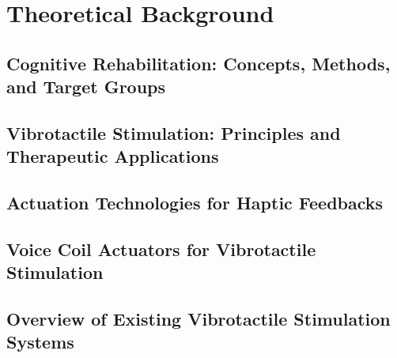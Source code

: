 \chapter[Theoretical Background]{Theoretical Background}

\section{Cognitive Rehabilitation: Concepts, Methods, and Target Groups}

\section{Vibrotactile Stimulation: Principles and Therapeutic Applications}

\section{Actuation Technologies for Haptic Feedbacks}

\section{Voice Coil Actuators for Vibrotactile Stimulation}

\section{Overview of Existing Vibrotactile Stimulation Systems}
